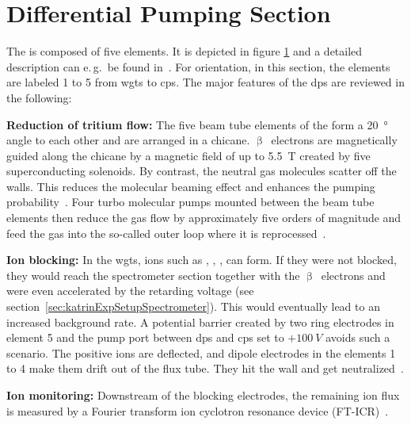 \section{Differential Pumping Section}
\label{sec:katrinExpSetupDiffPumpingSection}
\begin{figure}[t]
 \label{fig:katrinExpSetupDiffPumpingSection}
\end{figure}
The  is composed of five elements. It is depicted in figure \ref{fig:katrinExpSetupDiffPumpingSection} and a detailed description can e.\,g.~be found in~\cite{Kosmider2012}. For orientation, in this section, the elements are labeled 1 to 5 from \gls{wgts} to \gls{cps}. The major features of the \gls{dps} are reviewed in the following:

{\par\textbf{Reduction of tritium flow:}
The five beam tube elements of the  form a \SI{20}{\degree} angle to each other and are arranged in a chicane. $\upbeta$~electrons are magnetically guided along the chicane by a magnetic field of up to \SI{5.5}{T} created by five superconducting solenoids. By contrast, the neutral gas molecules scatter off the walls. This reduces the molecular beaming effect and enhances the pumping probability~\cite{ZHANG2012}. Four turbo molecular pumps mounted between the beam tube elements then reduce the gas flow by approximately five orders of magnitude and feed the gas into the so-called outer loop where it is reprocessed~\cite{Kosmider2012}.}

{\par\textbf{Ion blocking:}
In the \gls{wgts}, ions such as , , ,  can form. If they were not blocked, they would reach the spectrometer section together with the $\upbeta$~electrons and were even accelerated by the retarding voltage (see section~\ref{sec:katrinExpSetupSpectrometer}). This would eventually lead to an increased background rate. A potential barrier created by two ring electrodes in element 5 and the pump port between \gls{dps} and \gls{cps} set to $+\SI{100}{V}$ avoids such a scenario. The positive ions are deflected, and dipole electrodes in the elements 1 to 4 make them drift out of the flux tube. They hit the wall and get neutralized~\cite{Klein2019}.}

{\par\textbf{Ion monitoring:}
Downstream of the blocking electrodes, the remaining ion flux is measured by a Fourier transform ion cyclotron resonance device (FT-ICR)~\cite{Ubieto2009}.}
